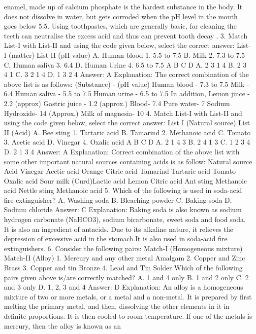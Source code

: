 enamel, made up of calcium phosphate is the hardest substance in
the body. It does not dissolve in water, but gets corroded when the
pH level in the mouth goes below 5.5. Using toothpastes, which are
generally basic, for cleaning the teeth can neutralise the excess acid
and thus can prevent tooth decay .
3. Match List-I with List-II and using the code given below,
select the correct answer:
List-I (matter) List-II (pH value)
A. Human blood 1. 5.5 to 7.5
B. Milk 2. 7.3 to 7.5
C. Human saliva 3. 6.4
D. Human Urine 4. 6.5 to 7.5
A B C D
A. 2 3 1 4
B. 2 3 4 1
C. 3 2 1 4
D. 1 3 2 4
Answer: A
Explanation:
The correct combination of the above list is as follows:
(Substance) - (pH value)
Human blood - 7.3 to 7.5
Milk - 6.4
Human saliva - 5.5 to 7.5
Human urine - 6.5 to 7.5
In addition,
Lemon juice - 2.2 (approx)
Gastric juice - 1.2 (approx.)
Blood- 7.4
Pure water- 7
Sodium Hydroxide- 14 (Approx.)
Milk of magnesia- 10
4. Match List-I with List-II and using the code given below,
select the correct answer:
List I (Natural source) List II (Acid)
A. Bee sting 1. Tartaric acid
B. Tamarind 2. Methanoic acid
C. Tomato 3. Acetic acid
D. Vinegar 4. Oxalic acid
A B C D
A. 2 1 4 3
B. 2 4 1 3
C. 1 2 3 4
D. 2 1 3 4
Answer: A
Explanation:
Correct combination of the above list with some other important
natural sources containing acids is as follow:
Natural source Acid
Vinegar Acetic acid
Orange Citric acid
Tamarind Tartaric acid
Tomato Oxalic acid
Sour milk (Curd)Lactic acid
Lemon Citric acid
Ant sting Methanoic acid
Nettle sting Methanoic acid
5. Which of the following is used in soda-acid fire extinguisher?
A. Washing soda
B. Bleaching powder
C. Baking soda
D. Sodium chloride
Answer: C
Explanation: Baking soda is also known as sodium hydrogen
carbonate (NaHCO3), sodium bicarbonate, sweet soda and food soda.
It is also an ingredient of antacids. Due to its alkaline nature, it
relieves the depression of excessive acid in the stomach.It is also
used in soda-acid fire extinguishers.
6. Consider the following pairs:
Match-I (Homogeneous mixture) Match-II (Alloy)
1. Mercury and any other metal Amalgam
2. Copper and Zinc Brass
3. Copper and tin Bronze
4. Lead and Tin Solder
Which of the following pairs given above is/are correctly matched?
A. 1 and 4 only
B. 1 and 2 only
C. 2 and 3 only
D. 1, 2, 3 and 4
Answer: D
Explanation: An alloy is a homogeneous mixture of two or more
metals, or a metal and a non-metal. It is prepared by first melting
the primary metal, and then, dissolving the other elements in it in
definite proportions. It is then cooled to room temperature.
If one of the metals is mercury, then the alloy is known as an
